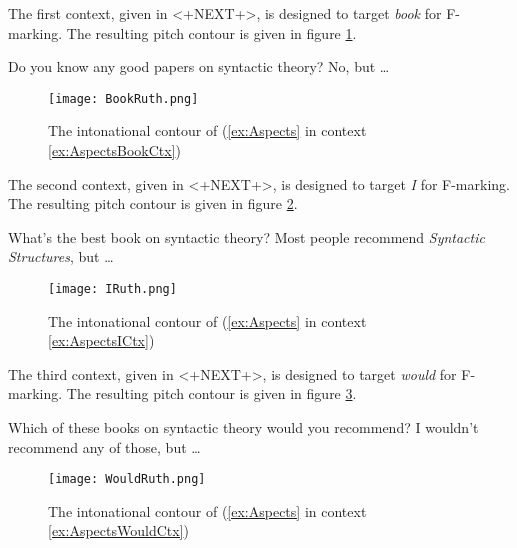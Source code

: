 \documentclass[
	letterpaper,
]{article}
\begin{document}
The first context, given in <+NEXT+>, is designed to target \textit{book} for F-marking.
The resulting pitch contour is given in figure \ref{fig:BookRuth}.
\begin{exe}
\ex \label{ex:AspectsBookCtx}
	\begin{xlist}
		 Do you know any good papers on syntactic theory?
		 No, but \dots
	\end{xlist}	
\end{exe}

\begin{figure}[h]
	\centering
	\texttt{[image: BookRuth.png]}
	\caption{The intonational contour of (\ref{ex:Aspects} in context \ref{ex:AspectsBookCtx})}
	\label{fig:BookRuth}
\end{figure}
\FloatBarrier

The second context, given in <+NEXT+>, is designed to target \textit{I} for F-marking.
The resulting pitch contour is given in figure \ref{fig:IRuth}.
\begin{exe}
\ex\label{ex:AspectsICtx}
\begin{xlist}
	 What’s the best book on syntactic theory?
	 Most people recommend \textit{Syntactic Structures}, but \dots
\end{xlist}	
\end{exe}

\begin{figure}[h]
	\centering
	\texttt{[image: IRuth.png]}
	\caption{The intonational contour of (\ref{ex:Aspects} in context \ref{ex:AspectsICtx})}
	\label{fig:IRuth}
\end{figure}
\FloatBarrier

The third context, given in <+NEXT+>, is designed to target \textit{would} for F-marking.
The resulting pitch contour is given in figure \ref{fig:WouldRuth}.
\begin{exe}	
\ex\label{ex:AspectsWouldCtx}
\begin{xlist}
	 Which of these books on syntactic theory would you recommend?
	 I wouldn’t recommend any of those, but \dots
\end{xlist}
\end{exe}
\begin{figure}[h]
	\centering
	\texttt{[image: WouldRuth.png]}
	\caption{The intonational contour of (\ref{ex:Aspects} in context \ref{ex:AspectsWouldCtx})}
	\label{fig:WouldRuth}
\end{figure}
\FloatBarrier

\nocite{mikkelsen2004specifying}
\printbibliography
\end{document}
